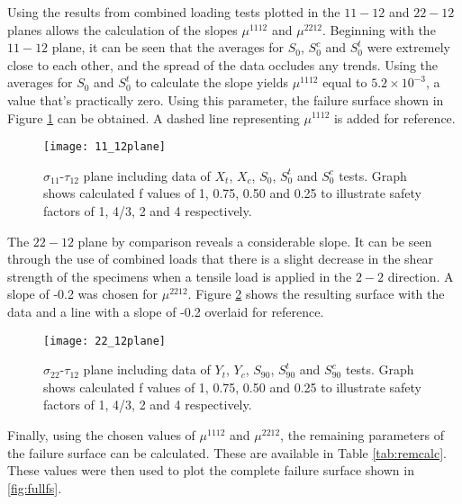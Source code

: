 \documentclass[main.tex]{subfiles}
\begin{document}
Using the results from combined loading tests plotted in the $11-12$ and $22-12$ planes allows the calculation of the slopes $\mu^{1112}$ and  $\mu^{2212}$. Beginning with the $11-12$ plane, it can be seen that the averages for $S_{0}$, $S_{0}^c$  and $S_{0}^t$ were extremely close to each other, and the spread of the data occludes any trends. Using the averages for $S_{0}$ and $S_{0}^t$ to calculate the slope yields $\mu^{1112}$ equal to $5.2\times 10^{-3}$, a value that's practically zero. Using this parameter, the failure surface shown in Figure \ref{fig:1112plane} can be obtained. A dashed line representing $\mu^{1112}$ is added for reference.

\pagebreak

\begin{figure}[!htbp]
	\center
	\texttt{[image: 11\_12plane]}
	\captionsetup{justification=centering} %
	\caption[failure envelope in the $\sigma_{11}$-$\tau_{12}$ plane]{$\sigma_{11}$-$\tau_{12}$ plane including data of $X_t$, $X_c$, $S_{0}$, $S_{0}^t$ and $S_{0}^c$ tests. Graph shows calculated f values of 1, 0.75, 0.50 and 0.25 to illustrate safety factors of 1, 4/3, 2 and 4 respectively.} \label{fig:1112plane}
\end{figure}

The $22-12$ plane by comparison reveals a considerable slope. It can be seen through the use of combined loads that there is a slight decrease in the shear strength of the specimens when a tensile load is applied in the $2-2$ direction. A slope of -0.2 was chosen for $\mu^{2212}$. Figure \ref{fig:2212plane} shows the resulting surface with the data and a line with a slope of -0.2 overlaid for reference.

\begin{figure}[!htbp]
	\center
	\texttt{[image: 22\_12plane]}
	\captionsetup{justification=centering} %
	\caption[failure envelope in the $\sigma_{22}$-$\tau_{12}$ plane]{$\sigma_{22}$-$\tau_{12}$ plane including data of $Y_t$, $Y_c$, $S_{90}$, $S_{90}^t$ and $S_{90}^c$ tests. Graph shows calculated f values of 1, 0.75, 0.50 and 0.25 to illustrate safety factors of 1, 4/3, 2 and 4 respectively.} \label{fig:2212plane}
\end{figure}

Finally, using the chosen values of $\mu^{1112}$ and $\mu^{2212}$, the remaining parameters of the failure surface can be calculated. These are available in Table \ref{tab:remcalc}. These values were then used to plot the complete failure surface shown in \ref{fig:fullfs}.
\end{document}

